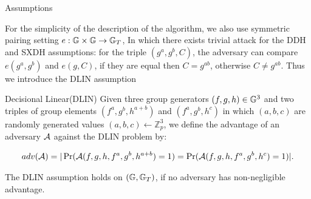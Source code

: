 \begin{subsection}{Assumptions}
  
  For the simplicity of the description of the algorithm, we also use symmetric pairing setting $e: \mathbb{G} \times \mathbb{G} \to \mathbb{G}_T$,
  In which there exists trivial attack for the DDH and SXDH assumptions: for the triple $(g^a, g^b, C)$, the adversary can compare $e(g^a, g^b)$ and $e(g, C)$, if they are equal then $C = g^{ab}$, otherwise $C \neq g^{ab}$.
  Thus we introduce the DLIN assumption
  \begin{myDef}{Decisional Linear(DLIN)}
    Given three group generators $(f, g, h) \in \mathbb{G}^3$ and two triples of group elements $(f^a, g^b, h^{a+b})$ and $(f^a, g^b, h^c)$ in which $(a, b, c)$ are randomly generated values $(a, b, c) \gets \mathbb{Z}_p^3$, we define the advantage of an adversary $\mathcal{A}$ against the DLIN problem by:

    \begin{align*}
      adv(\mathcal{A}) = |\operatorname{Pr}(\mathcal{A}(f, g, h, f^a, g^b, h^{a+b}) = 1) = \operatorname{Pr}(\mathcal{A}(f, g, h, f^a, g^b, h^c) = 1)|.
    \end{align*}

    The DLIN assumption holds on $(\mathbb{G}, \mathbb{G}_T)$, if no adversary has non-negligible advantage.
  \end{myDef}


  

\end{subsection}




